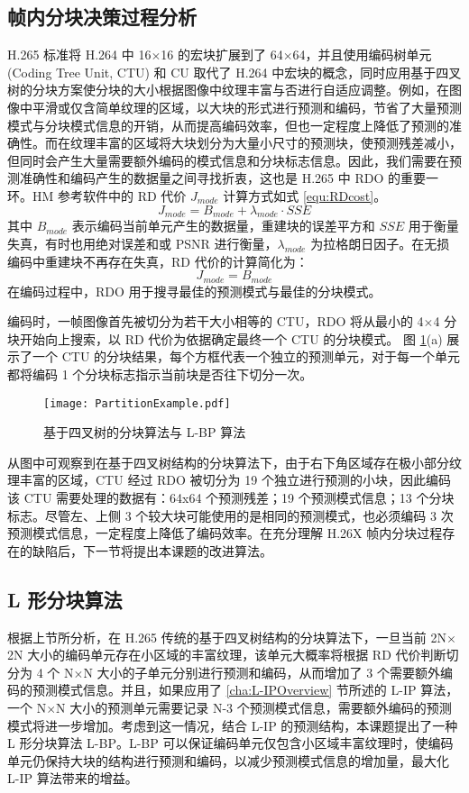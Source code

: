 \subsection{帧内分块决策过程分析}
H.265 标准将 H.264 中 16$\times$16 的宏块扩展到了 64$\times$64，并且使用编码树单元 (Coding Tree Unit, CTU) 和 CU 取代了 H.264 中宏块的概念，同时应用基于四叉树的分块方案使分块的大小根据图像中纹理丰富与否进行自适应调整。例如，在图像中平滑或仅含简单纹理的区域，以大块的形式进行预测和编码，节省了大量预测模式与分块模式信息的开销，从而提高编码效率，但也一定程度上降低了预测的准确性。而在纹理丰富的区域将大块划分为大量小尺寸的预测块，使预测残差减小，但同时会产生大量需要额外编码的模式信息和分块标志信息。因此，我们需要在预测准确性和编码产生的数据量之间寻找折衷，这也是 H.265 中 RDO 的重要一环。HM 参考软件中的 RD 代价 $J_{mode}$ 计算方式如式 \ref{equ:RDcost}。
\begin{equation}
    J_{mode}=B_{mode}+\lambda_{mode}\cdot SSE
    \label{equ:RDcost}
\end{equation}
其中 $B_{mode}$ 表示编码当前单元产生的数据量，重建块的误差平方和 $SSE$ 用于衡量失真，有时也用绝对误差和或 PSNR 进行衡量，$\lambda_{mode}$ 为拉格朗日因子。在无损编码中重建块不再存在失真，RD 代价的计算简化为：
\begin{equation}
    J_{mode}=B_{mode}
\end{equation}
在编码过程中，RDO 用于搜寻最佳的预测模式与最佳的分块模式。

编码时，一帧图像首先被切分为若干大小相等的 CTU，RDO 将从最小的 4$\times$4 分块开始向上搜索，以 RD 代价为依据确定最终一个 CTU 的分块模式。
图 \ref{fig:PartitionExample}(a) 展示了一个 CTU 的分块结果，每个方框代表一个独立的预测单元，对于每一个单元都将编码 1 个分块标志指示当前块是否往下切分一次。
\begin{figure}[hbt]
    \centering
    \texttt{[image: PartitionExample.pdf]}
    \caption{基于四叉树的分块算法与 L-BP 算法}
    \label{fig:PartitionExample}
\end{figure}
从图中可观察到在基于四叉树结构的分块算法下，由于右下角区域存在极小部分纹理丰富的区域，CTU 经过 RDO 被切分为 19 个独立进行预测的小块，因此编码该 CTU 需要处理的数据有：64x64 个预测残差；19 个预测模式信息；13 个分块标志。尽管左、上侧 3 个较大块可能使用的是相同的预测模式，也必须编码 3 次预测模式信息，一定程度上降低了编码效率。在充分理解 H.26X 帧内分块过程存在的缺陷后，下一节将提出本课题的改进算法。

\subsection{L 形分块算法}
根据上节所分析，在 H.265 传统的基于四叉树结构的分块算法下，一旦当前 2N$\times$2N 大小的编码单元存在小区域的丰富纹理，该单元大概率将根据 RD 代价判断切分为 4 个 N$\times$N 大小的子单元分别进行预测和编码，从而增加了 3 个需要额外编码的预测模式信息。并且，如果应用了 \ref{cha:L-IPOverview} 节所述的 L-IP 算法，一个 N$\times$N 大小的预测单元需要记录 N-3 个预测模式信息，需要额外编码的预测模式将进一步增加。考虑到这一情况，结合 L-IP 的预测结构，本课题提出了一种 L 形分块算法 L-BP。L-BP 可以保证编码单元仅包含小区域丰富纹理时，使编码单元仍保持大块的结构进行预测和编码，以减少预测模式信息的增加量，最大化 L-IP 算法带来的增益。

